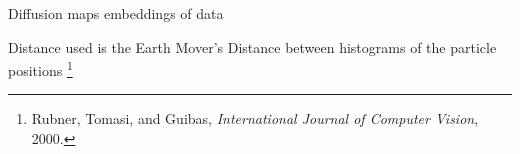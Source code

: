 \documentclass[12pt]{beamer}
\begin{document}
\begin{frame}{Diffusion maps embeddings of data}

{\scriptsize 
Distance used is the Earth Mover's Distance between histograms of the particle positions \footnote{Rubner, Tomasi, and Guibas, {\em International Journal of Computer Vision}, 2000.}
\par }

\centering

\def\figwidth{1.1in}

\end{frame}
\end{document}
